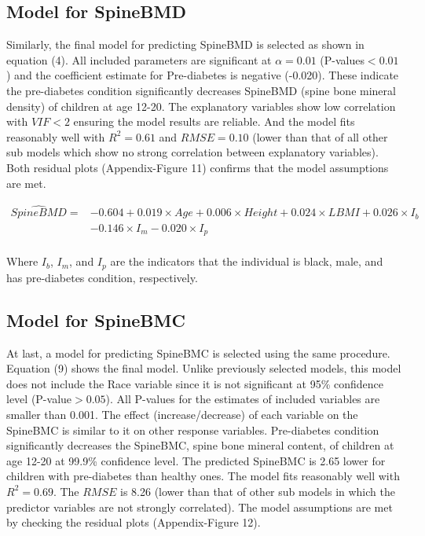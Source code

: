 \documentclass[11pt]{article}
\begin{document}
\subsection{Model for SpineBMD}
Similarly, the final model for predicting SpineBMD is selected as shown in equation (4). All included parameters are significant at $\alpha=0.01$ (P-values$<0.01$) and the coefficient estimate for Pre-diabetes is negative (-0.020). These indicate the pre-diabetes condition significantly decreases SpineBMD (spine bone mineral density) of children at age 12-20. The explanatory variables show low correlation with $VIF<2$ ensuring the model results are reliable. And the model fits reasonably well with $R^2= 0.61$ and $RMSE=0.10$ (lower than that of all other sub models which show no strong correlation between explanatory variables). Both residual plots (Appendix-Figure 11) confirms that the model assumptions are met.

\begin{equation}
\begin{split}
\hat{SpineBMD} = &-0.604 +0.019\times Age +0.006\times Height +0.024\times LBMI + 0.026\times I_b \\
& -0.146\times I_m -0.020\times I_p \\
\end{split}
\end{equation}

Where $I_b$, $I_m$, and $I_p$ are the indicators that the individual is black, male, and has pre-diabetes condition, respectively.

\subsection{Model for SpineBMC}
At last, a model for predicting SpineBMC is selected using the same procedure. Equation (9) shows the final model. Unlike previously selected models, this model does not include the Race variable since it is not significant at 95\% confidence level (P-value$>0.05$). All P-values for the estimates of included variables are smaller than 0.001. The effect (increase/decrease) of each variable on the SpineBMC is similar to it on other response variables. Pre-diabetes condition significantly decreases the SpineBMC, spine bone mineral content, of children at age 12-20 at 99.9\% confidence level. The predicted SpineBMC is 2.65 lower for children with pre-diabetes than healthy ones. The model fits reasonably well with $R^2=0.69$. The $RMSE$ is 8.26 (lower than that of other sub models in which the predictor variables are not strongly correlated). The model assumptions are met by checking the residual plots (Appendix-Figure 12).  
\end{document}

